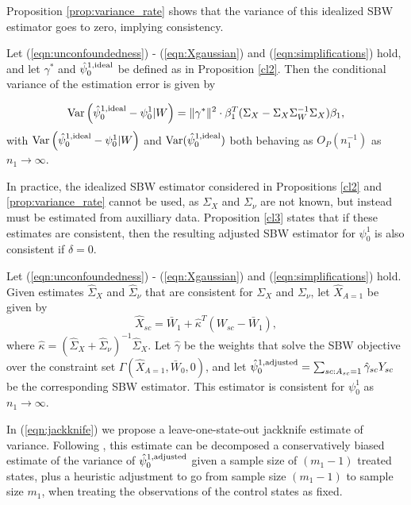 Proposition \ref{prop:variance_rate} shows that the variance of this idealized SBW estimator goes to zero, implying consistency. 
\begin{proposition}\label{prop:variance_rate}
Let (\ref{eqn:unconfoundedness}) - (\ref{eqn:Xgaussian}) and (\ref{eqn:simplifications}) hold, and let $\gamma^*$ and $\hat{\psi}_0^{1, \textup{ideal}}$ be defined as in Proposition \ref{cl2}. Then the conditional variance of the estimation error is given by

\begin{align*}
\operatorname{Var}\left( \hat{\psi}_0^{1, \textup{ideal}} - \psi_0^1| W\right)  = \|\gamma^*\|^2 \cdot \beta_1^T(\Sigma_{X} - \Sigma_{X}\Sigma_{W}^{-1}\Sigma_{X})\beta_1, 
\end{align*}
with $\operatorname{Var}\left( \hat{\psi}_0^{1, \textup{ideal}} - \psi_0^1| W\right)$ and $\operatorname{Var}(\hat{\psi}_0^{1,\textup{ideal}})$ both behaving as $O_P(n_1^{-1})$ as $n_1 \rightarrow \infty$.
\end{proposition}

In practice, the idealized SBW estimator considered in Propositions \ref{cl2} and \ref{prop:variance_rate} cannot be used, as $\Sigma_X$ and $\Sigma_{\nu}$ are not known, but instead must be estimated from auxilliary data. Proposition \ref{cl3} states that if these estimates are consistent, then the resulting adjusted SBW estimator for $\psi_0^1$ is also consistent if $\delta = 0$.

\begin{proposition}\label{cl3}
Let (\ref{eqn:unconfoundedness}) - (\ref{eqn:Xgaussian}) and (\ref{eqn:simplifications}) hold. Given estimates $\hat{\Sigma}_X$ and $\hat{\Sigma}_\nu$ that are consistent for $\Sigma_X$ and $\Sigma_\nu$, let $\hat{X}_{A=1}$ be given by 
\[ \hat{X}_{sc} = \bar{W}_1 + \hat{\kappa}^T(W_{sc} - \bar{W}_1), \]
where $\hat{\kappa} = (\hat{\Sigma}_X + \hat{\Sigma}_{\nu})^{-1} \hat{\Sigma}_X$. Let $\hat{\gamma}$ be the weights that solve the SBW objective over the constraint set $\Gamma(\hat{X}_{A=1}, \bar{W}_0, 0)$, and let $\hat{\psi}^{1, \textup{adjusted}}_0 = \sum_{sc: A_{sc} = 1} \hat{\gamma}_{sc} Y_{sc}$ be the corresponding SBW estimator. This estimator is consistent for $\psi_0^1$ as $n_1 \to \infty$.
\end{proposition}

In (\ref{eqn:jackknife}) we propose a leave-one-state-out jackknife estimate of variance. Following \cite{efron1981jackknife}, this estimate can be decomposed a conservatively biased estimate of the variance of $\hat{\psi}_0^{1, \textup{adjusted}}$ given a sample size of $(m_1-1)$ treated states, plus a heuristic adjustment to go from sample size $(m_1-1)$ to sample size $m_1$, when treating the observations of the control states as fixed.

